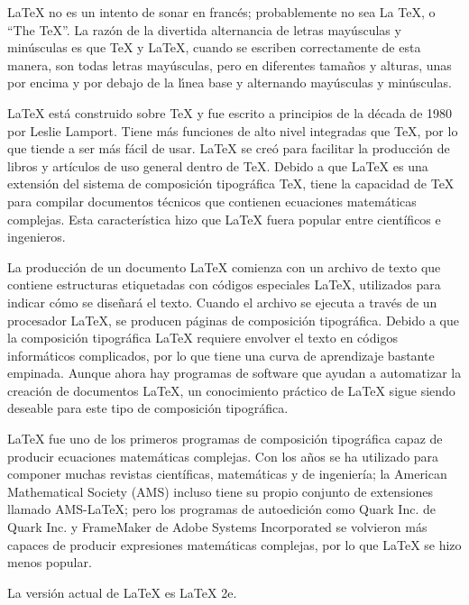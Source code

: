 \documentclass[letterpaper, 10pt, journal]{IEEEtran}
\begin{document}
\LaTeX{} no es un intento de sonar en franc\'{e}s; probablemente no sea La TeX, o \textquotedblleft{}The TeX\textquotedblright{}. La raz\'{o}n de la divertida alternancia de letras may\'{u}sculas y min\'{u}sculas es que TeX y \LaTeX{}, cuando se escriben correctamente de esta manera, son todas letras may\'{u}sculas, pero en diferentes tama\~{n}os y alturas, unas por encima y por debajo de la l\'{\i}nea base y alternando may\'{u}sculas y min\'{u}sculas. \cite{[3]}

\LaTeX{} est\'{a} construido sobre TeX y fue escrito a principios de la d\'{e}cada de 1980 por Leslie Lamport. Tiene m\'{a}s funciones de alto nivel integradas que TeX, por lo que tiende a ser m\'{a}s f\'{a}cil de usar.
\LaTeX{} se cre\'o para facilitar la producci\'on de libros y art\'iculos de uso general dentro de TeX. Debido a que \LaTeX{} es una extensi\'on del sistema de composici\'on tipogr\'afica TeX, tiene la capacidad de TeX para compilar documentos t\'ecnicos que contienen ecuaciones matem\'aticas complejas. Esta caracter\'istica hizo que \LaTeX{} fuera popular entre cient\'ificos e ingenieros. \cite{[1]}

La producci\'on de un documento \LaTeX{} comienza con un archivo de texto que contiene estructuras etiquetadas con c\'odigos especiales \LaTeX{}, utilizados para indicar c\'omo se dise\~nar\'a el texto. Cuando el archivo se ejecuta a trav\'es de un procesador \LaTeX{}, se producen p\'aginas de composici\'on tipogr\'afica. Debido a que la composici\'on tipogr\'afica \LaTeX{} requiere envolver el texto en c\'odigos inform\'aticos complicados, por lo que tiene una curva de aprendizaje bastante empinada. Aunque ahora hay programas de software que ayudan a automatizar la creaci\'on de documentos \LaTeX{}, un conocimiento pr\'actico de \LaTeX{} sigue siendo deseable para este tipo de composici\'on tipogr\'afica.

\LaTeX{} fue uno de los primeros programas de composici\'on tipogr\'afica capaz de producir ecuaciones matem\'aticas complejas. Con los a\~nos se ha utilizado para componer muchas revistas cient\'ificas, matem\'aticas y de ingenier\'{i}a; la American Mathematical Society (AMS) incluso tiene su propio conjunto de extensiones llamado AMS-LaTeX; pero los programas de autoedici\'on como Quark Inc. de Quark Inc. y FrameMaker de Adobe Systems Incorporated se volvieron m\'as capaces de producir expresiones matem\'aticas complejas, por lo que \LaTeX{} se hizo menos popular.\cite{[1]}

La versi\'on actual de \LaTeX{} es \LaTeX{} 2e. \cite{[2]}
\end{document}
